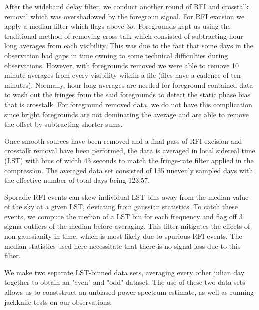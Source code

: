 \documentclass[twocolumn,numberedappendix]{emulateapj} \shorttitle{PSA64}
\begin{document}
After the wideband delay filter, we conduct another round of RFI and crosstalk
removal which was overshadowed by the foregroun signal. For RFI excision we
apply a median filter which flags above $3\sigma$. Foregrounds kept us using the
traditional method of removing cross talk which consisted of subtracting hour
long averages from each visibility. This was due to the fact that some days in
the observation had gaps in time owning to some technical difficulties during
observations. However, with foregrounds removed we were able to remove 10 minute
averages from every visibility within a file (files have a cadence of ten
minutes). Normally, hour long averages are needed for foreground contained data
to wash out the fringes from the said foregrounds to detect the static phase
bias that is crosstalk. For foreground removed data, we do not have this
complication since bright foregrounds are not dominating the average and are
able to remove the offset by subtracting shorter sums.

Once smooth sources have been removed and a final pass of RFI excision and
crosstalk removal have been performed, the data is averaged in local sidereal
time (LST) with bins of width 43 seconds to match the fringe-rate filter applied
in the compression. The averaged data set consisted of 135 unevenly sampled
days with the effective number of total days being 123.57. 

Sporadic RFI events can skew individual LST bins away from the median value of
the sky at a given LST, deviating from gaussian statistics. To catch these
events, we compute the median of a LST bin for each frequency and flag off 3
sigma outliers of the median before averaging. This filter mitigates
the effects of non gaussianity in time, which is most likely due to spurious
RFI events. The median statistics used here necessitate that there is no signal
loss due to this filter.

We make two separate LST-binned data sets, averaging every other julian day
together to obtain an "even" and "odd" dataset. The use of these two data sets
allows us to conststruct an unbiased power spectrum estimate, as well as running
jackknife tests on our observations. 
\end{document}
